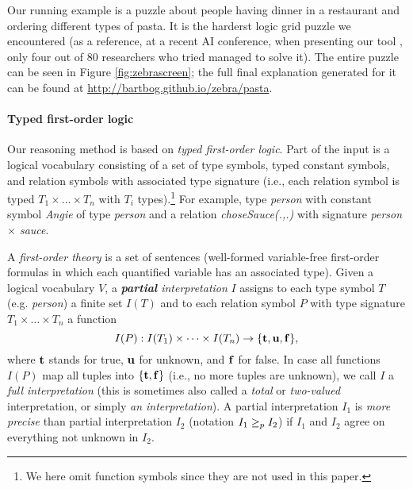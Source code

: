 Our running example is a puzzle about people having dinner in a restaurant and ordering different types of pasta. It is the harderst logic grid puzzle we encountered (as a reference, at a recent AI conference, when presenting our tool \cite{DBLP:conf/bnaic/ClaesBCGG19}, only four out of 80 researchers who tried managed to solve it).    
The entire puzzle can be seen in Figure \ref{fig:zebrascreen}; the full final explanation generated for it can be found at \url{http://bartbog.github.io/zebra/pasta}.

\paragraph{Typed first-order logic}
Our reasoning method is based on \emph{typed first-order logic}. %
Part of the input is a logical vocabulary consisting of a set of type symbols, typed constant symbols, and relation symbols with associated type signature (i.e., each relation symbol is typed $T_1\times \dots \times T_n$ with $T_i$ types).\footnote{We here omit function symbols since they are not used in this paper.} For example, type \textit{person} with constant symbol \textit{Angie} of type \textit{person} and a relation \textit{choseSauce(.,.)} with signature \textit{person $\times$ sauce}.


A \emph{first-order theory} is a set of sentences (well-formed variable-free first-order formulas in which each quantified variable has an associated type). 
Given a logical vocabulary $V$, a \emph{\textbf{partial} interpretation} $I$ assigns to each type symbol $T$ (e.g. \textit{person}) a finite set $I(T)$ and to each 
relation symbol $P$ with type signature $T_1\times \dots \times T_n$ a function 
\[I(P): I(T_1)\times \dots \times I(T_n)\to \{\mathbf{t},\mathbf{u},\mathbf{f}\},\] 
where $\mathbf{t}$ stands for true, $\mathbf{u}$ for unknown, and $\mathbf{f}$ for false. In case all functions $I(P)$ map all tuples into $\{\mathbf{t},\mathbf{f}\}$ (i.e., no more tuples are unknown), we call $I$ a \emph{full interpretation} (this is sometimes also called a \emph{total} or \emph{two-valued} interpretation, or simply \emph{an interpretation}). 
A partial interpretation $I_1$ is \emph{more precise} than partial interpretation $I_2$ (notation $I_1\geq_p I_2$) if $I_1$ and $I_2$ agree on everything not unknown in $I_2$.

% 
% 
